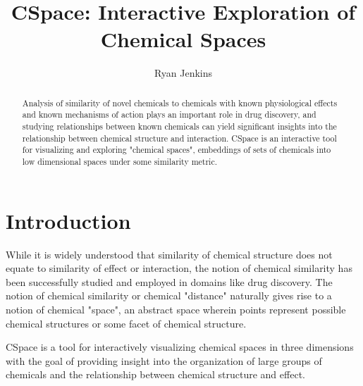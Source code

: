 \documentclass[12pt]{article}
\title{CSpace: Interactive Exploration of Chemical Spaces}
\author{Ryan Jenkins}
\begin{document}
\maketitle

\begin{abstract}
Analysis of similarity of novel chemicals to chemicals with known physiological effects and known mechanisms of action plays an important role in drug discovery, and studying relationships between known chemicals can yield significant insights into the relationship between chemical structure and interaction. CSpace is an interactive tool for visualizing and exploring "chemical spaces", embeddings of sets of chemicals into low dimensional spaces under some similarity metric.
\end{abstract}

\newpage
\section{Introduction}
While it is widely understood that similarity of chemical structure does not equate to similarity of effect or interaction, the notion of chemical similarity has been successfully studied and employed in domains like drug discovery\cite{Nikolova2003}. The notion of chemical similarity or chemical "distance" naturally gives rise to a notion of chemical "space", an abstract space wherein points represent possible chemical structures or some facet of chemical structure.

CSpace is a tool for interactively visualizing chemical spaces in three dimensions with the goal of providing insight into the organization of large groups of chemicals and the relationship between chemical structure and effect.

\newpage


\end{document}
